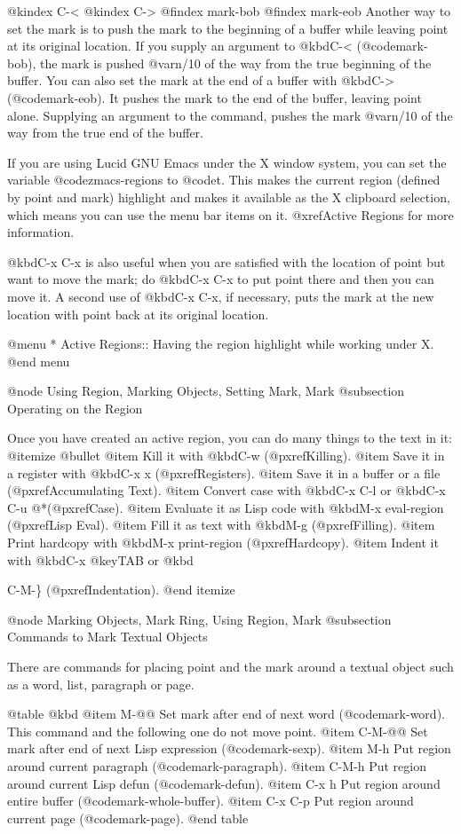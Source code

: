 {{@kindex C-<
@kindex C->
@findex mark-bob
@findex mark-eob
 Another way to set the mark is to push the mark to the beginning of a
buffer while leaving point at its original location. If you supply an
argument to @kbd{C-<} (@code{mark-bob}), the mark is pushed
@var{n}/10 of the way from the true beginning of the buffer. You can
also set the mark at the end of a buffer with @kbd{C->}
(@code{mark-eob}). It pushes the mark to the end of the buffer, leaving
point alone. Supplying an argument to the command, pushes the mark
@var{n}/10 of the way from the true end of the buffer.

If you are using Lucid GNU Emacs under the X window system, you can set
the variable @code{zmacs-regions} to @code{t}. This makes the current
region (defined by point and mark) highlight and makes it available as
the X clipboard selection, which means you can use the menu bar items on
it.  @xref{Active Regions} for more information.
 
  @kbd{C-x C-x} is also useful when you are satisfied with the location of
point but want to move the mark; do @kbd{C-x C-x} to put point there and
then you can move it.  A second use of @kbd{C-x C-x}, if necessary, puts
the mark at the new location with point back at its original location.

@menu
* Active Regions::  Having the region highlight while working under X.
@end menu

@node Using Region, Marking Objects, Setting Mark, Mark
@subsection Operating on the Region

  Once you have created an active region, you can do many things to
the text in it:
@itemize @bullet
@item
Kill it with @kbd{C-w} (@pxref{Killing}).
@item
Save it in a register with @kbd{C-x x} (@pxref{Registers}).
@item
Save it in a buffer or a file (@pxref{Accumulating Text}).
@item
Convert case with @kbd{C-x C-l} or @kbd{C-x C-u} @*(@pxref{Case}).
@item
Evaluate it as Lisp code with @kbd{M-x eval-region} (@pxref{Lisp Eval}).
@item
Fill it as text with @kbd{M-g} (@pxref{Filling}).
@item
Print hardcopy with @kbd{M-x print-region} (@pxref{Hardcopy}).
@item
Indent it with @kbd{C-x @key{TAB}} or @kbd{C-M-\} (@pxref{Indentation}).
@end itemize

@node Marking Objects, Mark Ring, Using Region, Mark
@subsection Commands to Mark Textual Objects

  There are commands for placing point and the mark around a textual
object such as a word, list, paragraph or page.
 
@table @kbd
@item M-@@
Set mark after end of next word (@code{mark-word}).  This command and
the following one do not move point.
@item C-M-@@
Set mark after end of next Lisp expression (@code{mark-sexp}).
@item M-h
Put region around current paragraph (@code{mark-paragraph}).
@item C-M-h
Put region around current Lisp defun (@code{mark-defun}).
@item C-x h
Put region around entire buffer (@code{mark-whole-buffer}).
@item C-x C-p
Put region around current page (@code{mark-page}).
@end table

}}}
